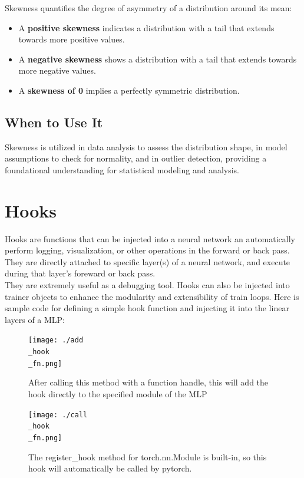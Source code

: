 \documentclass[12pt]{article}
\begin{document}
Skewness quantifies the degree of asymmetry of a distribution around its mean:
\begin{itemize}
    \item A \textbf{positive skewness} indicates a distribution with a tail that extends towards more positive values.
    \item A \textbf{negative skewness} shows a distribution with a tail that extends towards more negative values.
    \item A \textbf{skewness of 0} implies a perfectly symmetric distribution.
\end{itemize}

\subsection{When to Use It}

Skewness is utilized in data analysis to assess the distribution shape, in model assumptions to check for normality, and in outlier detection, providing a foundational understanding for statistical modeling and analysis.
\section{Hooks}
Hooks are functions that can be injected into a neural network an automatically perform logging, visualization, or other operations in the forward or back pass. They are directly attached to specific layer(s) of a neural network, and execute during that layer's foreward or back pass.\\

They are extremely useful as a debugging tool. Hooks can also be injected into trainer objects to enhance the modularity and extensibility of train loops. Here is sample code for defining a simple hook function and injecting it into the linear layers of a MLP: 

\begin{figure}[H] \centering \texttt{[image: ./add\\\_hook\\\_fn.png]} \caption{After calling this method with a function handle, this will add the hook directly to the specified module of the MLP} 
\end{figure}

\begin{figure}[H] \centering \texttt{[image: ./call\\\_hook\\\_fn.png]} \caption{The register\_hook method for torch.nn.Module is built-in, so this hook will automatically be called by pytorch.} 
\end{figure}
\end{document}
